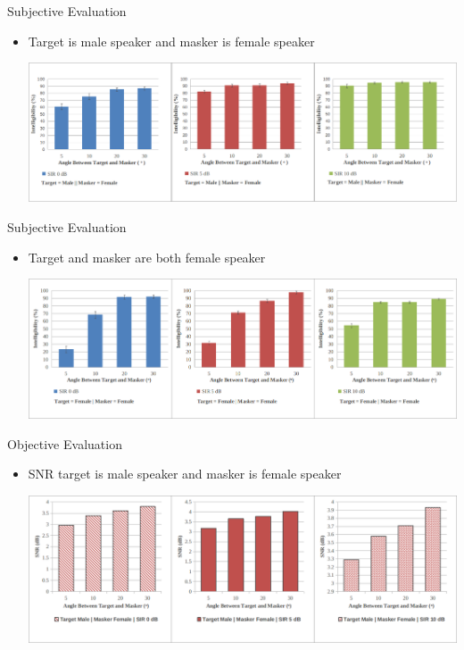 \documentclass{beamer}
\begin{document}
\begin{frame}[t]{Subjective Evaluation}
\begin{itemize}
\item Target is male speaker and masker is female speaker
\begin{center}
    \includegraphics[scale=0.33]{../pict/pcw_mmht_fena.png}
\end{center}
\end{itemize}
\end{frame}

\begin{frame}[t]{Subjective Evaluation}
\begin{itemize}
\item Target and masker are both female speaker
\begin{center}
    \includegraphics[scale=0.33]{../pict/pcw_fena_fena.png}
\end{center}
\end{itemize}
\end{frame}

\begin{frame}[t]{Objective Evaluation}
\begin{itemize}
\item SNR target is male speaker and masker is female speaker
\begin{center}
    \includegraphics[scale=0.33]{../pict/snr_mmht_fena.png}
\end{center}
\end{itemize}
\end{frame}
\end{document}
